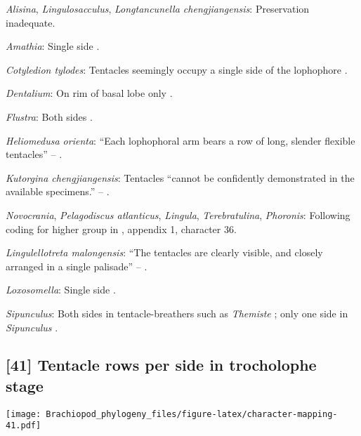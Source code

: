 \documentclass[openany]{book}
\theoremstyle{definition}
\theoremstyle{definition}
\theoremstyle{definition}
\theoremstyle{remark}
\begin{document}
\hypertarget{Alisina-coding-40}{}
\emph{Alisina}, \emph{Lingulosacculus}, \emph{Longtancunella
chengjiangensis}: Preservation inadequate.

\hypertarget{Amathia-coding-40}{}
\emph{Amathia}: Single side \citep{Temereva2016Thenervous}.

\hypertarget{Cotyledion_tylodes-coding-40}{}
\emph{Cotyledion tylodes}: Tentacles seemingly occupy a single side of
the lophophore \citep{Zhang2013}.

\hypertarget{Dentalium-coding-40}{}
\emph{Dentalium}: On rim of basal lobe only \citep{Morton1959}.

\hypertarget{Flustra-coding-40}{}
\emph{Flustra}: Both sides \citep{Schwaha2015, Shunkina2015}.

\hypertarget{Heliomedusa_orienta-coding-40}{}
\emph{Heliomedusa orienta}: ``Each lophophoral arm bears a row of long,
slender flexible tentacles'' -- \citet{Zhang2009Architectureand}.

\hypertarget{Kutorgina_chengjiangensis-coding-40}{}
\emph{Kutorgina chengjiangensis}: Tentacles ``cannot be confidently
demonstrated in the available specimens.'' --
\citet{Zhang2007Rhynchonelliformeanbrachiopods}.

\hypertarget{Lingula-coding-40}{}
\emph{Novocrania}, \emph{Pelagodiscus atlanticus}, \emph{Lingula},
\emph{Terebratulina}, \emph{Phoronis}: Following coding for higher group
in \citet{Carlson1995Phylogeneticrelationships}, appendix 1, character
36.

\hypertarget{Lingulellotreta_malongensis-coding-40}{}
\emph{Lingulellotreta malongensis}: ``The tentacles are clearly visible,
and closely arranged in a single palisade'' -- \citet{Zhang2004Newdata}.

\hypertarget{Loxosomella-coding-40}{}
\emph{Loxosomella}: Single side \citep{Nielsen1966}.

\hypertarget{Sipunculus-coding-40}{}
\emph{Sipunculus}: Both sides in tentacle-breathers such as
\emph{Themiste} \citep{Ruppert1995, Adrianov2006}; only one side in
\emph{Sipunculus} \citep{Ruppert1995, Adrianov2006}.

\subsection*{{[}41{]} Tentacle rows per side in trocholophe
stage}\label{tentacle-rows-per-side-in-trocholophe-stage}

\texttt{[image: Brachiopod\_phylogeny\_files/figure-latex/character-mapping-41.pdf]}
\end{document}
